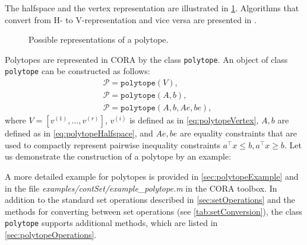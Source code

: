 The halfspace and the vertex representation are illustrated in \cref{fig_polytope}. Algorithms that convert from H- to V-representation and vice versa are presented in \cite{Kaibel2003}.

\begin{figure}[htb]		
    \centering
	\hspace{1cm}
	  \caption{Possible representations of a polytope.}
	  \label{fig_polytope}
\end{figure}


Polytopes are represented in CORA by the class \texttt{polytope}.
An object of class \texttt{polytope} can be constructed as follows:
\begin{equation*}
	\begin{split}
		& \mathcal{P} = \texttt{polytope}(V), \\
		& \mathcal{P} = \texttt{polytope}(A,b), \\
		& \mathcal{P} = \texttt{polytope}(A,b,Ae,be),
	\end{split}
\end{equation*} 
where $V = [v^{(1)},\dots,v^{(r)}]$, $v^{(i)}$ is defined as in \eqref{eq:polytopeVertex}, $A,b$ are defined as in \eqref{eq:polytopeHalfspace}, and $Ae,be$ are equality constraints that are used to compactly represent pairwise inequality constraints $a^\top x \leq b, a^\top x \geq b$. Let us demonstrate the construction of a polytope by an example:

\begin{center}
\begin{minipage}[t]{0.55\textwidth}
	\vspace{5pt}
	\footnotesize
	
\end{minipage}
\begin{minipage}[t]{0.3\textwidth}
	\vspace{0pt}
	\centering
\end{minipage}
\end{center}

A more detailed example for polytopes is provided in \cref{sec:polytopeExample} and in the file \textit{examples/contSet/example\_polytope.m} in the CORA toolbox. In addition to the standard set operations described in \cref{sec:setOperations} and the methods for converting between set operations (see \cref{tab:setConversion}), the class \texttt{polytope} supports additional methods, which are listed in \cref{sec:polytopeOperations}.